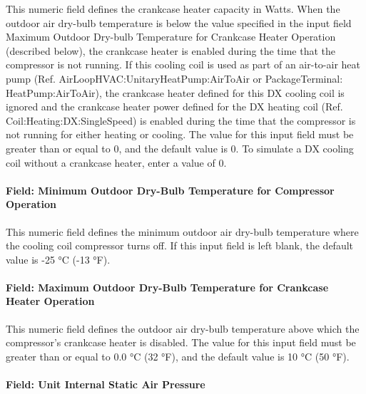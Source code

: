 This numeric field defines the crankcase heater capacity in Watts. When the outdoor air dry-bulb temperature is below the value specified in the input field Maximum Outdoor Dry-bulb Temperature for Crankcase Heater Operation (described below), the crankcase heater is enabled during the time that the compressor is not running. If this cooling coil is used as part of an air-to-air heat pump (Ref. AirLoopHVAC:UnitaryHeatPump:AirToAir or PackageTerminal: HeatPump:AirToAir), the crankcase heater defined for this DX cooling coil is ignored and the crankcase heater power defined for the DX heating coil (Ref. Coil:Heating:DX:SingleSpeed) is enabled during the time that the compressor is not running for either heating or cooling. The value for this input field must be greater than or equal to 0, and the default value is 0. To simulate a DX cooling coil without a crankcase heater, enter a value of 0.

\paragraph{Field: Minimum Outdoor Dry-Bulb Temperature for Compressor Operation}\label{field-minimum-outdoor-dry-bulb-temperature-for-compressor-operation}

This numeric field defines the minimum outdoor air dry-bulb temperature where the cooling coil compressor turns off. If this input field is left blank, the default value is -25 °C (-13 °F).

\paragraph{Field: Maximum Outdoor Dry-Bulb Temperature for Crankcase Heater Operation}\label{field-maximum-outdoor-dry-bulb-temperature-for-crankcase-heater-operation}

This numeric field defines the outdoor air dry-bulb temperature above which the compressor's crankcase heater is disabled. The value for this input field must be greater than or equal to 0.0 °C (32 °F), and the default value is 10 °C (50 °F).

\paragraph{Field: Unit Internal Static Air Pressure}\label{field-unit-internal-static-air-pressure}

